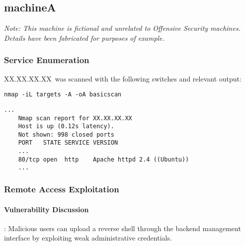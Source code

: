 
\renewcommand{\hostname}{machineA}
\renewcommand{\os}{\textit{Ubuntu 16.04 LTS}}
\renewcommand{\ip}{XX.XX.XX.XX}

\renewcommand{\vuln}{}
\renewcommand{\product}{}
\renewcommand{\vulnx}{\vulnPassword}
\renewcommand{\productx}{}
\def\gotroot{}   %

\subsection{\label{\hostname}\hostname}

\textit{Note: This machine is fictional and unrelated to Offensive Security machines. Details have been fabricated for purposes of example.}

\subsubsection{Service Enumeration}

\ip\ was scanned with the following switches and relevant output:
\par \texttt{nmap -iL targets -A -oA basicscan}

\begin{lstlisting}[caption={Nmap scan},label={lst:nmap}]
	...
	Nmap scan report for XX.XX.XX.XX
	Host is up (0.12s latency).
	Not shown: 998 closed ports
	PORT   STATE SERVICE VERSION
	...
	80/tcp open  http    Apache httpd 2.4 ((Ubuntu))
	...
\end{lstlisting}




\subsubsection{Remote Access Exploitation}

\paragraph{Vulnerability Discussion} 
\vulnPassword: Malicious users can upload a reverse shell through the backend management interface by exploiting weak administrative credentials.

